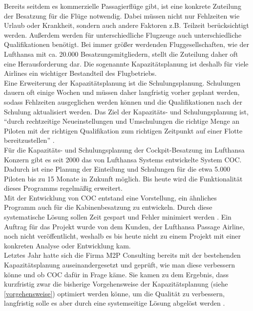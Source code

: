 \documentclass [12pt, a4paper, oneside, titlepage, ngerman]{article}
\begin{document}
Bereits seitdem es kommerzielle Passagierflüge gibt, ist eine konkrete Zuteilung der Besatzung für die Flüge notwendig. Dabei müssen nicht nur Fehlzeiten wie Urlaub oder Krankheit, sondern auch andere Faktoren z.B. Teilzeit berücksichtigt werden. Außerdem werden für unterschiedliche Flugzeuge auch unterschiedliche Qualifikationen benötigt. Bei immer größer werdenden Fluggesellschaften, wie der Lufthansa mit ca. 20.000 Besatzungsmitgliedern, stellt die Zuteilung daher oft eine Herausforderung dar. Die sogenannte Kapazitätsplanung ist deshalb für viele Airlines ein wichtiger Bestandteil des Flugbetriebs. \\
Eine Erweiterung der Kapazitätsplanung ist die Schulungsplanung. Schulungen dauern oft einige Wochen und müssen daher langfristig vorher geplant werden, sodass Fehlzeiten ausgeglichen werden können und die Qualifikationen nach der Schulung aktualisiert werden. Das Ziel der Kapazitäts- und Schulungsplanung ist, "`durch rechtzeitige Neueinstellungen und Umschulungen die richtige Menge an Piloten mit der richtigen Qualifikation zum richtigen Zeitpunkt auf einer Flotte bereitzustellen"' \cite[vgl.][S.19]{compasdoku}. \\

\noindent Für die Kapazitäts- und Schulungsplanung der Cockpit-Besatzung im Lufthansa Konzern gibt es seit 2000 das von Lufthansa Systems entwickelte System \ac{COC}. Dadurch ist eine Planung der Einteilung und Schulungen für die etwa 5.000 Piloten bis zu 15 Monate in Zukunft möglich. Bis heute wird die Funktionalität dieses Programms regelmäßig erweitert.  \\
Mit der Entwicklung von \ac{COC} entstand eine Vorstellung, ein ähnliches Programm auch für die Kabinenbesatzung zu entwickeln. Durch diese systematische Lösung sollen Zeit gespart und Fehler minimiert werden \cite[vgl.][S.4]{highlevelitems}. Ein Auftrag für das Projekt wurde von dem Kunden, der Lufthansa Passage Airline, noch nicht veröffentlicht, weshalb es bis heute nicht zu einem Projekt mit einer konkreten Analyse oder Entwicklung kam.  \\

\noindent Letztes Jahr hatte sich die Firma M2P Consulting bereits mit der bestehenden Kapazitätsplanung auseinandergesetzt und geprüft, wie man diese verbessern könne und ob \ac{COC} dafür in Frage käme. Sie kamen zu dem Ergebnis, dass kurzfristig zwar die bisherige Vorgehensweise der Kapazitätsplanung (siehe \ref{vorgehensweise}) optimiert werden könne, um die Qualität zu verbessern, langfristig solle es aber durch eine systemseitige Lösung abgelöst werden \cite [vgl.][S.8-10]{M2P}. %
\end{document}
